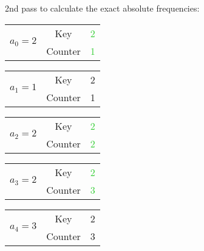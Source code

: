 \documentclass{article}
\newcommand{\MGinc}[1]{\textcolor{LimeGreen}{#1}}
\begin{document}
  2nd pass to calculate the exact absolute frequencies:
  \begin{center}
    \begin{minipage}{0.45\textwidth}
      \begin{center}
        \begin{tabular}{c|c|c|}
          \cline{2-3}
          \multirow{2}{*}{\textbf{\LARGE{$a_0=2$}}}
          & Key & \MGinc{2} \\\cline{2-3}
          & Counter & \MGinc{1} \\
          \cline{2-3}
        \end{tabular}\vspace{3mm}

        \begin{tabular}{c|c|c|}
          \cline{2-3}
          \multirow{2}{*}{\textbf{\LARGE{$a_1=1$}}}
          & Key & 2 \\\cline{2-3}
          & Counter & 1 \\
          \cline{2-3}
        \end{tabular}\vspace{3mm}

        \begin{tabular}{c|c|c|}
          \cline{2-3}
          \multirow{2}{*}{\textbf{\LARGE{$a_2=2$}}}
          & Key & \MGinc{2} \\\cline{2-3}
          & Counter & \MGinc{2} \\
          \cline{2-3}
        \end{tabular}\vspace{3mm}

        \begin{tabular}{c|c|c|}
          \cline{2-3}
          \multirow{2}{*}{\textbf{\LARGE{$a_3=2$}}}
          & Key & \MGinc{2} \\\cline{2-3}
          & Counter & \MGinc{3} \\
          \cline{2-3}
        \end{tabular}\vspace{3mm}

        \begin{tabular}{c|c|c|}
          \cline{2-3}
          \multirow{2}{*}{\textbf{\LARGE{$a_4=3$}}}
          & Key & 2 \\\cline{2-3}
          & Counter & 3 \\
          \cline{2-3}
        \end{tabular}\vspace{3mm}


\end{center}
\end{minipage}
\end{center}
\end{document}
